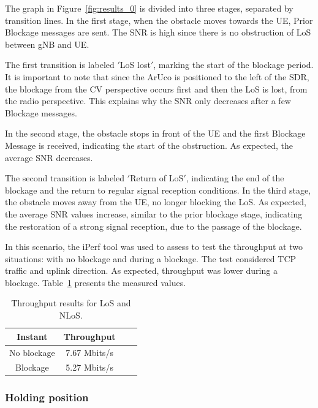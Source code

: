 The graph in Figure~\ref{fig:results_0} is divided into three stages, separated by transition lines.
In the first stage, when the obstacle moves towards the UE, Prior Blockage messages are sent.
The SNR is high  since there is no obstruction of LoS between gNB and UE\@.

The first transition is labeled \('\)LoS lost\('\), marking the start of the blockage period.
It is important to note that since the ArUco is positioned to the left of the SDR, the blockage from the CV perspective occurs first and then the LoS is lost, from the radio perspective.
This explains why the SNR only decreases after a few Blockage messages.

In the second stage, the obstacle stops in front of the UE and the first Blockage Message is received, indicating the start of the obstruction.
As expected, the average SNR decreases.

The second transition is labeled \('\)Return of LoS\('\), indicating the end of the blockage and the return to regular signal reception conditions.
In the third stage, the obstacle moves away from the UE, no longer blocking the LoS\@.
As expected, the average SNR values increase, similar to the prior blockage stage, indicating the restoration of a strong signal reception, due to the passage of the blockage.

In this scenario, the iPerf tool was used to assess to test the throughput at two situations: with no blockage and during a blockage.
The test considered TCP traffic and uplink direction.
As expected, throughput was lower during a blockage.
Table~\ref{tab:iperf} presents the measured values.


\begin{table}[h]
    \centering %
    \begin{tabular}{|c|c|c|c|}
        \hline
        \textbf{Instant} & \textbf{Throughput} \\ \hline
        No blockage & 7.67 Mbits/s \\ \hline
        Blockage   &  5.27 Mbits/s \\ \hline
    \end{tabular}
    \caption{Throughput results for LoS and NLoS.} %
    \label{tab:iperf} %
\end{table}

\subsubsection{Holding position}

